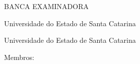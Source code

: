 

%
% 
%
\begin{folhadeaprovacao}

	\begin{center}
		{\selectfont\MakeTextUppercase{\normalsize\imprimirautor}}
	\end{center}
    \vfill
    
	\vfill
	\begin{center}
		{\selectfont\MakeTextUppercase{\imprimirtitulo}}
	\end{center}
	\vfill

%


\vfill
        
	 \begin{center}
	 	
    	{\selectfont BANCA EXAMINADORA}
    	\vspace*{0.25cm}
    
		 \par
		\vspace{0.15cm}
		Universidade do Estado de Santa Catarina

		 \par
		\vspace{0.15cm}
		Universidade do Estado de Santa Catarina

	 \end{center}
	
    {Membros:} 
    

\end{folhadeaprovacao}
